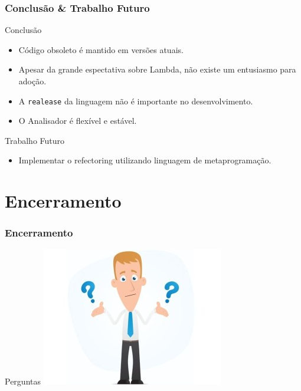 \documentclass[]{beamer}
\begin{document}

	\begin{frame}[fragile, label=re]\frametitle{Conclusão  \& Trabalho Futuro}
		\begin{block}{Conclusão}
			\begin{itemize}
				\item Código obsoleto é mantido em versões atuais.
				\item Apesar da grande espectativa sobre Lambda, não existe um entusiasmo para adoção.
				\item A \texttt{realease} da linguagem não é importante no desenvolvimento.
				\item O Analisador é flexível e estável.
			\end{itemize}
		\end{block}
		
		\begin{block}{Trabalho Futuro}
			\begin{itemize}
				\item Implementar o refectoring utilizando linguagem de metaprogramação.
			\end{itemize}
		\end{block}
	\end{frame}	



	\section{Encerramento}
	\begin{frame}[label=encerramento]
		\frametitle{Encerramento}
		\begin{block}{Perguntas}
			\centering
			\includegraphics[scale=0.6]{duvidas.jpg}\\
		\end{block}
	\end{frame}
\end{document}
